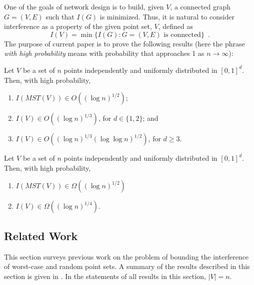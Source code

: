\documentclass{patmorin}
\newcommand{\mst}{\mathit{MST}}
\begin{document}
One of the goals of network design is to build, given $V$, a connected
graph $G=(V,E)$ such that $I(G)$ is minimized.  Thus, it is natural to consider interference as a property of the given point set, $V$, defined as
\[
  I(V) = \min\{I(G) : \mbox{$G=(V,E)$ is connected}\} \enspace .
\]
The purpose of current paper is to prove the following results (here the phrase \emph{with high probability} means with probability that approaches 1 as $n\rightarrow\infty$):
\begin{thm}
  Let $V$ be a set of $n$ points independently and uniformly distributed
  in $[0,1]^d$.  Then, with high probability,
\begin{enumerate}
  \item  $I(\mst(V))\in O((\log n)^{1/2})$;
  \item  $I(V)\in O((\log n)^{1/3})$, for $d\in\{1,2\}$; and 
  \item $I(V)\in O((\log n)^{1/3}(\log\log n)^{1/2})$, for $d\ge 3$.
\end{enumerate}
\end{thm}
\begin{thm}
  Let $V$ be a set of $n$ points independently and uniformly distributed
  in $[0,1]^d$.  Then, with high probability, 
\begin{enumerate}
  \item $I(\mst(V))\in\Omega((\log n)^{1/2})$ 
  \item $I(V)\in \Omega((\log n)^{1/4})$.
\end{enumerate}
\end{thm}


\subsection{Related Work}

This section surveys previous work on the problem of bounding the
interference of worst-case and random point sets.  A summary of the
results described in this section is given in .  In the
statements of all results in this section, $|V|=n$.
\end{document}
